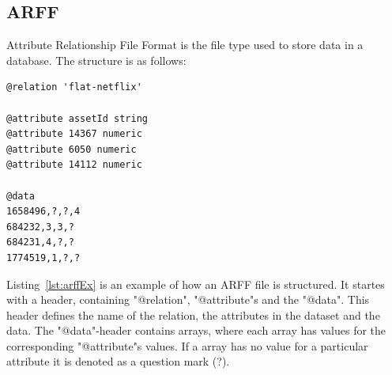 \subsection{ARFF}
Attribute Relationship File Format is the file type used to store data in a database. The structure is as follows:

\begin{lstlisting}[caption={ARFF Example},label={lst:arffEx},captionpos=b]
@relation 'flat-netflix'

@attribute assetId string
@attribute 14367 numeric
@attribute 6050 numeric
@attribute 14112 numeric

@data
1658496,?,?,4
684232,3,3,?
684231,4,?,?
1774519,1,?,?
\end{lstlisting}

Listing~\ref{lst:arffEx} is an example of how an ARFF file is structured. It startes with a header, containing "@relation", "@attribute"s and the "@data". This header defines the name of the relation, the attributes in the dataset and the data. The "@data"-header contains arrays, where each array has values for the corresponding "@attribute"s values. If a array has no value for a particular attribute it is denoted as a question mark (?).

